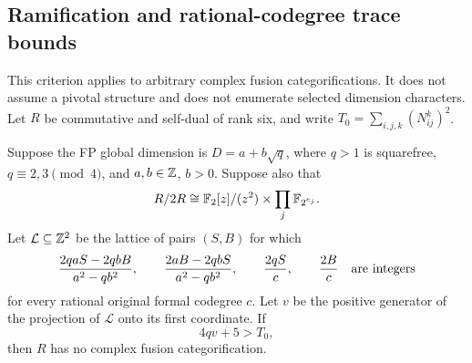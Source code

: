 \subsection{Ramification and rational-codegree trace bounds}
\label{subsec:ramification-trace}
This criterion applies to arbitrary complex fusion categorifications.  It
does not assume a pivotal structure and does not enumerate selected
dimension characters.  Let $R$ be commutative and self-dual of rank six,
and write $T_0=\sum_{i,j,k}(N_{ij}^k)^2$.

\begin{proposition}
\label{prop:ramification-trace}
Suppose the FP global dimension is
$D=a+b\sqrt q$, where $q>1$ is squarefree,
$q\equiv2,3\pmod4$, and $a,b\in\mathbb Z$, $b>0$.
Suppose also that
\[
 R/2R\cong\mathbb F_2[z]/(z^2)\times\prod_j\mathbb F_{2^{e_j}}.
\]
Let $\mathcal L\subseteq\mathbb Z^2$ be the lattice of pairs $(S,B)$ for which
\[
 \frac{2qaS-2qbB}{a^2-qb^2},\qquad
 \frac{2aB-2qbS}{a^2-qb^2},\qquad
 \frac{2qS}{c},\qquad\frac{2B}{c}
 \quad\hbox{are integers}
\]
for every rational original formal codegree $c$.
Let $v$ be the positive generator of the projection of $\mathcal L$
onto its first coordinate.  If
\[
 4qv+5>T_0,
\]
then $R$ has no complex fusion categorification.
\end{proposition}
